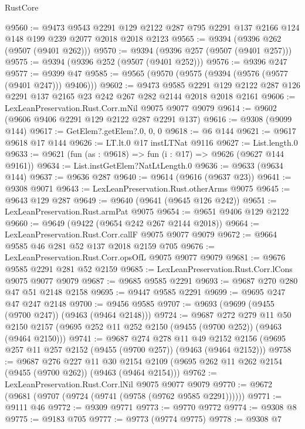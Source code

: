 \begin{lexlean}{RustCore}
\begin{coremodule}
@9560 := @9473
    @9543
    @2291
    @129
    @2122
    @287
    @795
    @2291
    @137
    @2166
    @124
    @148
    @199
    @239
    @2077
    @2018
    @2018
    @2123
@9565 := @9394 (@9396 @262 (@9507 (@9401 @262)))
@9570 := @9394 (@9396 @257 (@9507 (@9401 @257)))
@9575 := @9394 (@9396 @252 (@9507 (@9401 @252)))
@9576 := @9396 @247
@9577 := @9399 @47
@9585 := @9565 (@9570 (@9575 (@9394 (@9576 (@9577 (@9401 @247))) @9406)))
@9602 := @9473
    @9585
    @2291
    @129
    @2122
    @287
    @126
    @2291
    @137
    @2165
    @23
    @242
    @267
    @282
    @2144
    @2018
    @2018
    @2161
@9606 := LexLeanPreservation.Rust.Corr.mNil @9075 @9077 @9079
@9614 := @9602 (@9606 @9406 @2291 @129 @2122 @287 @2291 @137)
@9616 := @9308 (@9099 @144)
@9617 := GetElem?.getElem?.{0, 0, 0}
@9618 := @6 @144
@9621 := @9617 @9618 @17 @144
@9626 := LT.lt.{0} @17 instLTNat @9116
@9627 := List.length.{0}
@9633 := @9621 (fun (as : @9618) => fun (i : @17) => @9626 (@9627 @144 @9161))
@9634 := List.instGetElem?NatLtLength.{0}
@9636 := @9633 (@9634 @144)
@9637 := @9636 @287
@9640 := @9614 (@9616 (@9637 @23))
@9641 := @9308 @9071
@9643 := LexLeanPreservation.Rust.otherArms @9075
@9645 := @9643 @129 @287
@9649 := @9640 (@9641 (@9645 @126 @242))
@9651 := LexLeanPreservation.Rust.armPat @9075
@9654 := @9651 @9406 @129 @2122
@9660 := @9649 (@9422 (@9654 @242 @267 @2144 @2018))
@9664 := LexLeanPreservation.Rust.Corr.callF @9075 @9077 @9079
@9672 := @9664 @9585 @46 @281 @52 @137 @2018 @2159 @705
@9676 := LexLeanPreservation.Rust.Corr.opsOfL @9075 @9077 @9079
@9681 := @9676 @9585 @2291 @281 @52 @2159
@9685 := LexLeanPreservation.Rust.Corr.lCons @9075 @9077 @9079
@9687 := @9685 @9585 @2291
@9693 := @9687 @270 @280 @47 @51 @2148 @2158
@9695 := @9447 @9585 @2291
@9699 := @9695 @247 @47 @247 @2148
@9700 := @9456 @9585
@9707 := @9693 (@9699 (@9455 (@9700 @247)) (@9463 (@9464 @2148)))
@9724 := @9687
    @272
    @279
    @11
    @50
    @2150
    @2157
    (@9695 @252 @11 @252 @2150 (@9455 (@9700 @252)) (@9463 (@9464 @2150)))
@9741 := @9687
    @274
    @278
    @11
    @49
    @2152
    @2156
    (@9695 @257 @11 @257 @2152 (@9455 (@9700 @257)) (@9463 (@9464 @2152)))
@9758 := @9687
    @276
    @227
    @11
    @30
    @2154
    @2109
    (@9695 @262 @11 @262 @2154 (@9455 (@9700 @262)) (@9463 (@9464 @2154)))
@9762 := LexLeanPreservation.Rust.Corr.lNil @9075 @9077 @9079
@9770 := @9672 (@9681 (@9707 (@9724 (@9741 (@9758 (@9762 @9585 @2291))))))
@9771 := @9111 @46
@9772 := @9309 @9771
@9773 := @9770 @9772
@9774 := @9308 @8
@9775 := @9183 @705
@9777 := @9773 (@9774 @9775)
@9778 := @9308 @7

\end{coremodule}
\end{lexlean}
